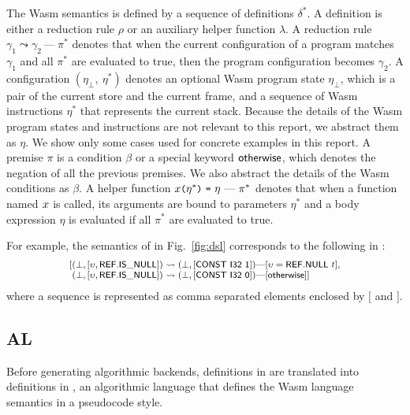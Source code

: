 The Wasm semantics is defined by a sequence of definitions $\delta^*$.
A definition is either a reduction rule $\rho$ or an auxiliary helper function $\lambda$.
A reduction rule $\gamma_1 \leadsto \gamma_2\ \mbox{---}\ \pi^*$ denotes that
when the current configuration of a program matches $\gamma_1$ and
all $\pi^*$ are evaluated to true, then the program configuration becomes $\gamma_2$.
A configuration $(\eta_\bot,\ \eta^*)$ denotes an optional Wasm program state $\eta_\bot$,
which is a pair of the current store and the current frame,
and a sequence of Wasm instructions $\eta^*$ that represents the current stack.
Because the details of the Wasm program states and instructions are
not relevant to this report,
we abstract them as $\eta$. We show only some cases used for concrete
examples in this report.
A premise $\pi$ is a condition $\beta$ or a special keyword
\ensuremath{\mathsf{\small otherwise}},
which denotes the negation of all the previous premises.
We also abstract the details of the Wasm conditions as $\beta$.
A helper function $\varx \kwrl \eta^* \kwrr\ \kwequ\ \eta\ \mbox{---}\ \pi^*$ denotes that
when a function named $x$ is called, its arguments are bound to parameters $\eta^*$
and a body expression $\eta$ is evaluated if all $\pi^*$ are evaluated to true.

For example, the semantics of 
in Fig.~\ref{fig:dsl} corresponds to the following in \dl:
\[
\footnotesize
\begin{array}{l@{}l@{~}c@{~}l}
[&(\bot, [\upsilon, \ssf{REF.IS\_NULL}]) &\leadsto& (\bot, [\ssf{CONST\ I32\ 1}])
\mbox{---} [\upsilon = \ssf{REF.NULL}\ t],\\
&(\bot, [\upsilon, \ssf{REF.IS\_NULL}])&\leadsto&(\bot, [\ssf{CONST\ I32\ 0}])
\mbox{---}[\ssf{\small otherwise}] ]
\end{array}
\]
where a sequence is represented as comma separated elements
enclosed by $[$ and $]$.

\subsection{AL}\label{sec:aldef} %
Before generating algorithmic backends, definitions in \dl are translated into definitions in \al,
an algorithmic language that defines the Wasm language semantics in a pseudocode style.

